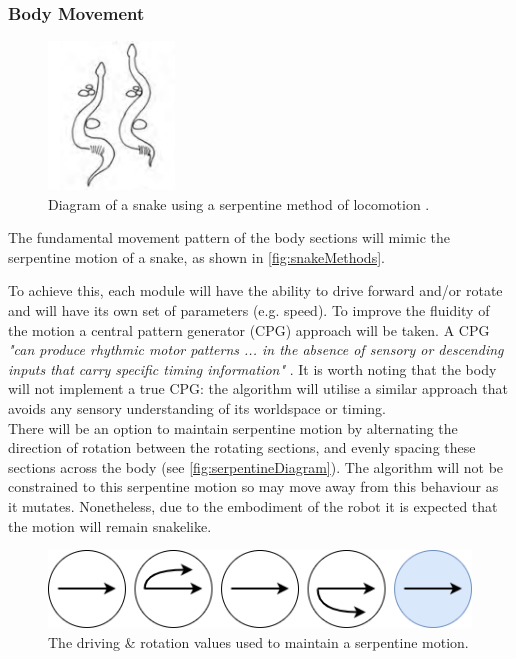 \documentclass{article}
\begin{document}
\newpage
\subsubsection{Body Movement}
\label{sec:Body Movement}
\begin{figure}
    \centering
    \vspace*{-5mm}
    \includegraphics[width=0.3\textwidth]{serpentine}
    \vspace*{-7mm}
\caption{Diagram of a snake using a serpentine method of locomotion \citep{reptileLocomotion}.}
    \label{fig:snakeMethods}
\end{figure}
The fundamental movement pattern of the body sections will mimic the serpentine motion of a snake, as shown in \autoref{fig:snakeMethods}.

To achieve this, each module will have the ability to drive forward and/or rotate and will have its own set of parameters (e.g. speed). To improve the fluidity of the motion a central pattern generator (CPG) approach will be taken. A CPG \textit{"can produce rhythmic motor patterns ... in the absence of sensory or descending inputs that carry specific timing information"} . It is worth noting that the body will not implement a true CPG: the algorithm will utilise a similar approach that avoids any sensory understanding of its worldspace or timing.\\

There will be an option to maintain serpentine motion by alternating the direction of rotation between the rotating sections, and evenly spacing these sections across the body (see \autoref{fig:serpentineDiagram}). The algorithm will not be constrained to this serpentine motion so may move away from this behaviour as it mutates. Nonetheless, due to the embodiment of the robot it is expected that the motion will remain snakelike.\\
\begin{figure}[H]
\centering
\includegraphics[scale=0.6]{serpentineDiagram}
\caption{The driving \& rotation values used to maintain a serpentine motion.}
\label{fig:serpentineDiagram}
\end{figure}
\end{document}
